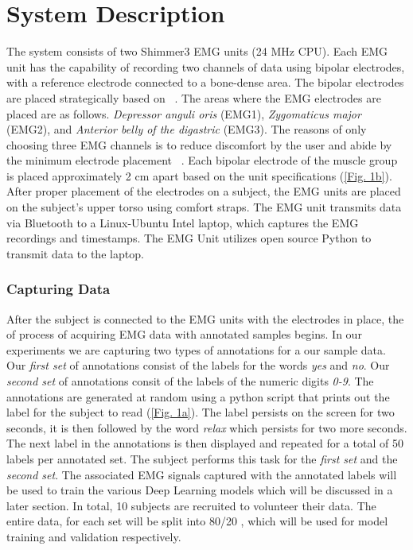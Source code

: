 \documentclass[conference]{IEEEtran}
\begin{document}
\section{System Description}
The system consists of two Shimmer3 EMG units (24 MHz CPU). Each EMG unit has the capability of recording two channels of data using  bipolar electrodes, with a reference electrode connected to a bone-dense area. The bipolar electrodes are placed strategically based on ~\cite{lopez-larraz_syllable-based_2010}. The areas where the EMG electrodes are placed are as follows. \textit{Depressor anguli oris} (EMG1), \textit{Zygomaticus major} (EMG2), and \textit{Anterior belly of the digastric} (EMG3). The reasons of only choosing three EMG channels is to reduce discomfort by the user and abide by the minimum electrode placement ~\cite{maier-hein_session_2005}. Each bipolar electrode of the muscle group is placed approximately 2 cm apart based on the unit specifications (\figurename \ref{Fig. 1b}). After proper placement of the electrodes on a subject, the EMG units are placed on the subject's upper torso using comfort straps. The EMG unit transmits data via Bluetooth to a Linux-Ubuntu Intel laptop, which captures the EMG recordings and timestamps. The EMG Unit utilizes open source Python to transmit data to the laptop.

\subsubsection*{Capturing Data}
After the subject is connected to the EMG units with the electrodes in place, the of process of acquiring EMG data with annotated samples begins. In our experiments we are capturing two types of annotations for a our sample data. Our \textit{first set} of annotations consist of the labels for the words \textit{yes} and \textit{no}. Our \textit{second set} of annotations consit of the labels of the numeric digits \textit{0-9}. The annotations are generated at random using a python script that prints out the label for the subject to read  (\figurename \ref{Fig. 1a}). The label persists on the screen for two seconds, it is  then followed by the word \textit{relax} which persists for two more seconds. The next label in the annotations is then displayed and repeated for a total of 50 labels per annotated set. The subject performs this task for the \textit{first set} and the \textit{second set}. The associated EMG signals captured with the annotated labels will be used to train the various Deep Learning models which will be discussed in a later section. In total, 10 subjects are recruited to volunteer their data. The entire data, for each set will be split into 80/20 , which will be used for model training and validation respectively. 
\end{document}
